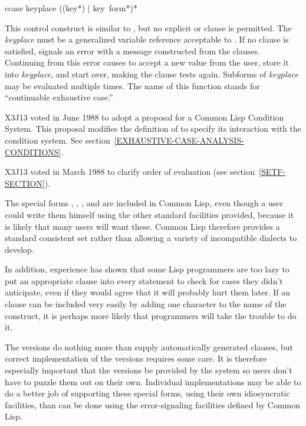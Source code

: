 \begin{defmac}
ccase keyplace {({({key}*) | key} {\,form}*)}*

\begin{obsolete}\noindent
This control construct is similar to ,
but no explicit  or  clause is permitted.
The {\it keyplace} must be a generalized variable reference
acceptable to .  If no clause is satisfied,  signals an error
with a message constructed from the clauses.  Continuing from this error
causes  to accept a new value from the user, store it into
{\it keyplace}, and start over, making the clause tests again.  Subforms of
{\it keyplace} may be evaluated multiple times.  The name of this function
stands for ``continuable exhaustive case.''
\end{obsolete}

\begin{new}
X3J13 voted in June 1988
to adopt a proposal for a Common Lisp Condition System. 
This proposal modifies the definition of  to specify its
interaction with the condition system.
See section~\ref{EXHAUSTIVE-CASE-ANALYSIS-CONDITIONS}.
\end{new}

\begin{newer}
X3J13 voted in March 1988 
to clarify order of evaluation (see section~\ref{SETF-SECTION}).
\end{newer}
\end{defmac}

\beforenoterule
\begin{rationale}
The special forms
, , , and 
are included in Common Lisp, even though a user
could write them himself using the other standard facilities provided,
because it is likely that many users will want these.
Common Lisp therefore provides
a standard consistent set rather than allowing
a variety of incompatible dialects to develop.

In addition, experience has shown that
some Lisp programmers are too lazy to put an appropriate
 clause into every  statement to
check for cases they
didn't anticipate, even if they would agree that it will probably 
hurt them later.  If an  clause can be included
very easily by adding one character to the name of the construct,
it is perhaps more likely that programmers will take the trouble to do it. 

The  versions do nothing more than supply
automatically generated  clauses, but correct
implementation of the  versions
requires some care.  It is therefore especially
important that the  versions be provided
by the system so users don't have to puzzle them out on
their own.  Individual implementations may be able to do a better job
of supporting these special forms,
using their own idiosyncratic facilities, than can be done
using the error-signaling facilities defined by Common Lisp.
\end{rationale}
\afternoterule
